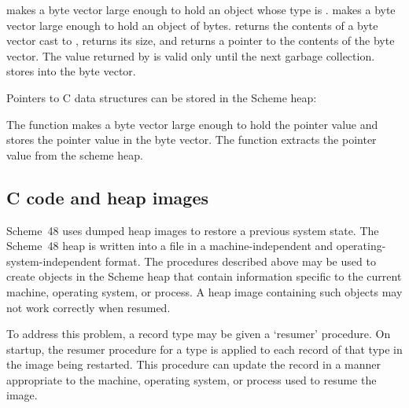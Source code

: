 \noindent{}
 makes a byte vector large enough to hold an object
whose type is .
 makes a byte vector large enough to hold an object
of  bytes.
 returns the contents of a byte vector cast to
 ,  returns its size,
and  returns a pointer to the
contents of the byte vector.
The value returned by  is valid only until
the next garbage collection.
 stores  into the byte vector.

Pointers to C data structures can be stored in the Scheme heap:

\begin{protos}
\end{protos}

\noindent{}The function  makes a byte
vector large enough to hold the pointer value and stores the pointer
value in the byte vector.  The function
 extracts the pointer value from the
scheme heap.

\subsection{C code and heap images}
\label{sec:hibernation}

Scheme~48 uses dumped heap images to restore a previous system state.
The Scheme~48 heap is written into a file in a machine-independent and
 operating-system-independent format.
The procedures described above may be used to create objects in the
 Scheme heap that contain information specific to the current
 machine, operating system, or process.
A heap image containing such objects may not work correctly
 when resumed.

To address this problem, a record type may be given a `resumer'
 procedure.
On startup, the resumer procedure for a type is applied to each record of
 that type in the image being restarted.
This procedure can update the record in a manner appropriate to
 the machine, operating system, or process used to resume the
 image.

\begin{protos}
\end{protos}

